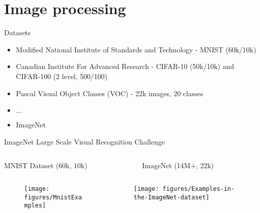 \section{Image processing}

\begin{frame}{Datasets} 
	\begin{itemize}
		\item Modified National Institute of Standards and Technology - MNIST (60k/10k)
		\item Canadian Institute For Advanced Research -  CIFAR-10 (50k/10k) and CIFAR-100 (2 level, 500/100) 
		\item Pascal Visual Object Classes (VOC) - 22k images, 20 classes
		\item $\dots$ 
		\item ImageNet 
	\end{itemize}
\end{frame}

\begin{frame}{ImageNet Large Scale Visual Recognition Challenge}
	\begin{columns}
		\begin{column}{.5\textwidth}
			\begin{center}
				MNIST Dataset (60k, 10k)
			\end{center}
		\end{column}
		\begin{column}{.5\textwidth}
			\begin{center}
				ImageNet (14M+, 22k)
			\end{center}
		\end{column}
	\end{columns}
	\begin{columns}
		\begin{column}{.5\textwidth}
			\begin{figure}
				\texttt{[image: figures/MnistExamples]}
				\caption*{}
			\end{figure}
		\end{column}
		\begin{column}{.5\textwidth}
			\begin{figure}
			\texttt{[image: figures/Examples-in-the-ImageNet-dataset]}
			\caption*{}
		\end{figure}
		\end{column}
	\end{columns}
\end{frame}

